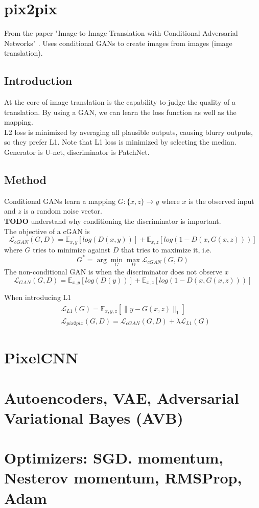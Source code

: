 \documentclass[../main.tex]{subfiles}
\begin{document}
\section{pix2pix}
From the paper "Image-to-Image Translation with Conditional Adversarial Networks" \cite{pix-to-pix}.
Uses conditional GANs to create images from images (image translation).


\subsection{Introduction}
At the core of image translation is the capability to judge the quality of a translation. By using a GAN,
we can learn the loss function as well as the mapping. \\
L2 loss is minimized by averaging all plausible outputs, causing blurry outputs, so they prefer L1.
Note that L1 loss is minimized by selecting the median. \\
Generator is U-net, discriminator is PatchNet.

\subsection{Method}
Conditional GANs learn a mapping $G: \{x, z\} \rightarrow y$ where $x$ is the observed input and $z$
is a random noise vector. \\
\textbf{TODO} understand why conditioning the discriminator is important. \\
The objective of a cGAN is
\begin{equation}
    \mathcal{L}_{cGAN}(G, D) = \mathbb{E}_{x,y}[log(D(x,y))] + \mathbb{E}_{x,z}[log(1-D(x, G(x, z)))]
\end{equation}
where $G$ tries to minimize against $D$ that tries to maximize it, i.e.
\begin{equation}
    G^* = \arg \min_G \max_D \mathcal{L}_{cGAN}(G, D)
\end{equation}
The non-conditional GAN is when the discriminator does not observe $x$
\begin{equation}
    \mathcal{L}_{GAN}(G, D) = \mathbb{E}_{x,y}[log(D(y))] + \mathbb{E}_{x,z}[log(1-D(x, G(x, z)))]
\end{equation}

When introducing L1
\begin{align}
    &\mathcal{L}_{L1}(G) = \mathbb{E}_{x,y,z}[\|y - G(x, z)\|_1] \\
    &\mathcal{L}_{pix2pix}(G, D) = \mathcal{L}_{cGAN}(G, D) + \lambda \mathcal{L}_{L1}(G)
\end{align}


\section{PixelCNN}
\section{Autoencoders, VAE, Adversarial Variational Bayes (AVB)}
\section{Optimizers: SGD. momentum, Nesterov momentum, RMSProp, Adam}
\end{document}
